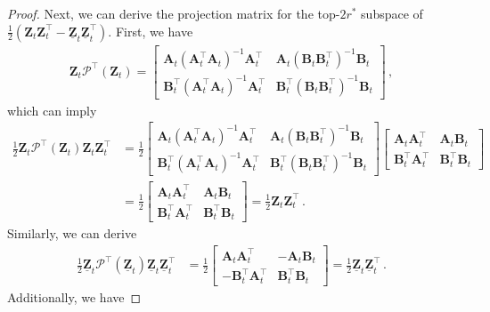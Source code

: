 \begin{proof}
Next, we can derive the projection matrix for the top-$2r^*$ subspace of $\frac{1}{2}\left(\bm Z_t\bm Z_t^{\!\top}-\underline{\bm Z}_t\underline{\bm Z}_t^{\!\top}\right)$. First, we have
\begin{align*}
    \bm Z_t\mathcal{P}^{\!\top}(\bm Z_t)=\begin{bmatrix}
        \bm A_t(\bm A_t^{\!\top}\bm A_t)^{-1}\bm A_t^{\!\top} & \bm A_t(\bm B_t\bm B_t^{\!\top})^{-1}\bm B_t\\
        \bm B_t^{\!\top}(\bm A_t^{\!\top}\bm A_t)^{-1}\bm A_t^{\!\top} & \bm B_t^{\!\top}(\bm B_t\bm B_t^{\!\top})^{-1}\bm B_t
    \end{bmatrix}\,,
\end{align*}
which can imply
\begin{align*}
    \frac{1}{2}\bm Z_t\mathcal{P}^{\!\top}(\bm Z_t)\bm Z_t\bm Z_t^{\!\top}&=\frac{1}{2}\begin{bmatrix}
        \bm A_t(\bm A_t^{\!\top}\bm A_t)^{-1}\bm A_t^{\!\top} & \bm A_t(\bm B_t\bm B_t^{\!\top})^{-1}\bm B_t\\
        \bm B_t^{\!\top}(\bm A_t^{\!\top}\bm A_t)^{-1}\bm A_t^{\!\top} & \bm B_t^{\!\top}(\bm B_t\bm B_t^{\!\top})^{-1}\bm B_t
    \end{bmatrix}\begin{bmatrix}
        \bm A_t \bm A_t^{\!\top} & \bm A_t \bm B_t\\
        \bm B_t^{\!\top}\bm A_t^{\!\top} & \bm B^{\!\top}_t \bm B_t
    \end{bmatrix}\\
    &=\frac{1}{2}\begin{bmatrix}
        \bm A_t \bm A_t^{\!\top} & \bm A_t \bm B_t\\
        \bm B_t^{\!\top}\bm A_t^{\!\top} & \bm B^{\!\top}_t \bm B_t
    \end{bmatrix}=\frac{1}{2}\bm Z_t\bm Z_t^{\!\top} \,.
\end{align*}
Similarly, we can derive
\begin{align*}
    \frac{1}{2}\underline{\bm Z}_t\mathcal{P}^{\!\top}(\underline{\bm Z}_t)\underline{\bm Z}_t\underline{\bm Z}_t^{\!\top}&=\frac{1}{2}\begin{bmatrix}
        \bm A_t \bm A_t^{\!\top} & -\bm A_t \bm B_t\\
        -\bm B_t^{\!\top}\bm A_t^{\!\top} & \bm B^{\!\top}_t \bm B_t
    \end{bmatrix}=\frac{1}{2}\underline{\bm Z}_t\underline{\bm Z}_t^{\!\top} \,.
\end{align*}
Additionally, we have

\end{proof}
